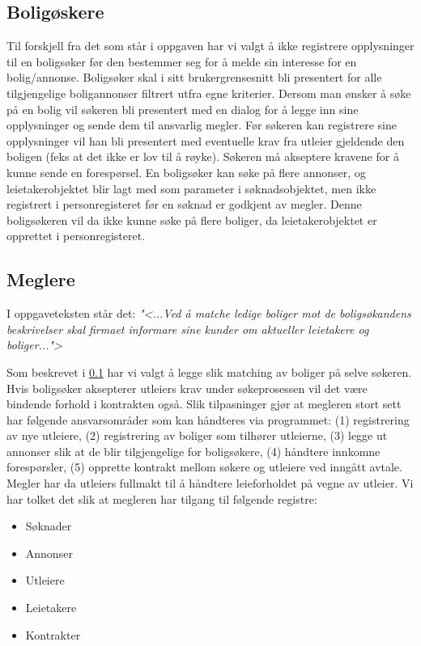 \subsection{Boligøskere} \label{sec:sokere}
Til forskjell fra det som står i oppgaven har vi valgt å ikke registrere opplysninger til en boligsøker før den bestemmer seg for å melde sin interesse for en bolig/annonse. Boligsøker skal i sitt brukergrensesnitt bli presentert for alle tilgjengelige boligannonser filtrert utfra egne kriterier. Dersom man ønsker å søke på en bolig vil søkeren bli presentert med en dialog for å legge inn sine opplysninger og sende dem til ansvarlig megler. Før søkeren kan registrere sine opplysninger vil han bli presentert med eventuelle krav fra utleier gjeldende den boligen (feks at det ikke er lov til å røyke). Søkeren må akseptere kravene for å kunne sende en forespørsel. En boligsøker kan søke på flere annonser, og leietakerobjektet blir lagt med som parameter i søknadsobjektet, men ikke registrert i personregisteret før en søknad er godkjent av megler. Denne boligsøkeren vil da ikke kunne søke på flere boliger, da leietakerobjektet er opprettet i personregisteret. 

\subsection{Meglere}
I oppgaveteksten står det:
\textit{"<...Ved å matche ledige boliger mot de boligsøkandens beskrivelser skal firmaet informare sine kunder om aktueller leietakere og boliger...">}

Som beskrevet i \ref{sec:sokere} har vi valgt å legge slik matching av boliger på selve søkeren. Hvis boligsøker aksepterer utleiers krav under søkeprosessen vil det være bindende forhold i kontrakten også. Slik tilpasninger gjør at megleren stort sett har følgende ansvarsområder som kan håndteres via programmet: (1) registrering av nye utleiere, (2) registrering av boliger som tilhører utleierne, (3) legge ut annonser slik at de blir tilgjengelige for boligsøkere, (4) håndtere innkomne forespørsler, (5) opprette kontrakt mellom søkere og utleiere ved inngått avtale. Megler har da utleiers fullmakt til å håndtere leieforholdet på vegne av utleier. 
Vi har tolket det slik at megleren har tilgang til følgende registre:
\begin{itemize}
\item Søknader
\item Annonser
\item Utleiere
\item Leietakere
\item Kontrakter
\end{itemize}

